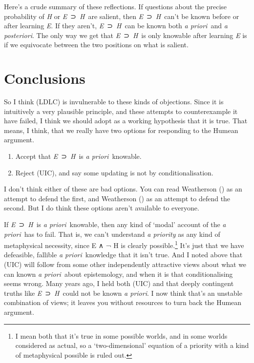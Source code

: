\documentclass[
  10pt,
  letterpaper,
  DIV=11,
  numbers=noendperiod,
  twoside]{scrartcl}
\providecommand{\tightlist}{%
  \setlength{\itemsep}{0pt}\setlength{\parskip}{0pt}}\usepackage{longtable,booktabs,array}
\begin{document}
Here's a crude summary of these reflections. If questions about the
precise probability of \emph{H} or \emph{E}~⊃~\emph{H}~are salient, then
\emph{E}~⊃~\emph{H}~can't be known before or after learning \emph{E}. If
they aren't, \emph{E}~⊃~\emph{H}~can be known both \emph{a priori}~and
\emph{a posteriori}. The only way we get that \emph{E}~⊃~\emph{H}~is
only knowable after learning \emph{E} is if we equivocate between the
two positions on what is salient.

\section{Conclusions}\label{conclusions}

So I think (LDLC) is invulnerable to these kinds of objections. Since it
is intuitively a very plausible principle, and these attempts to
counterexample it have failed, I think we should adopt as a working
hypothesis that it is true. That means, I think, that we really have two
options for responding to the Humean argument.

\begin{enumerate}
\def\labelenumi{\arabic{enumi}.}
\tightlist
\item
  Accept that \emph{E}~⊃~\emph{H}~is \emph{a priori}~knowable.
\item
  Reject (UIC), and say some updating is not by conditionalisation.
\end{enumerate}

I don't think either of these are bad options. You can read Weatherson
() as an attempt to defend the first,
and Weatherson () as an attempt to
defend the second. But I do think these options aren't available to
everyone.

If \emph{E}~⊃~\emph{H}~is \emph{a priori}~knowable, then any kind of
`modal' account of the \emph{a priori}~has to fail. That is, we can't
understand \emph{a priority} as any kind of metaphysical necessity,
since E ∧ ¬ H is clearly possible.\footnote{I mean both that it's true
  in some possible worlds, and in some worlds considered as actual, so a
  `two-dimensional' equation of a priority with a kind of metaphysical
  possible is ruled out.} It's just that we have defeasible, fallible
\emph{a priori}~knowledge that it isn't true. And I noted above that
(UIC) will follow from some other independently attractive views about
what we can known \emph{a priori}~about epistemology, and when it is
that conditionalising seems wrong. Many years ago, I held both (UIC) and
that deeply contingent truths like \emph{E}~⊃~\emph{H}~could not be
known \emph{a priori}. I now think that's an unstable combination of
views; it leaves you without resources to turn back the Humean argument.
\end{document}
